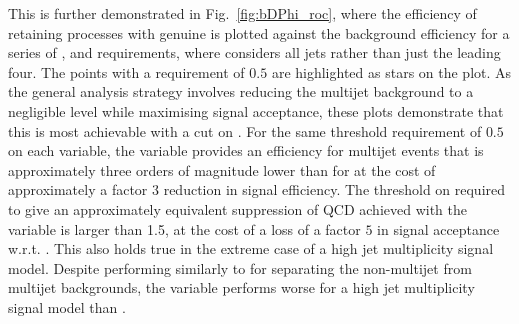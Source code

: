 This is further demonstrated in Fig.~\ref{fig:bDPhi_roc}, where the
efficiency of retaining processes with genuine \mht is plotted against
the \QCD background efficiency for a series of \bdphi, \dphimhtj and
\dphimhtjall requirements, where \dphimhtjall considers all jets rather than
just the leading four. The points with a requirement of $0.5$ are highlighted
as stars on the plot. As the general analysis strategy involves reducing
the \QCD multijet background to a negligible level while maximising
signal acceptance, these plots demonstrate that this is most
achievable with a cut on \bdphi. For the same threshold requirement of
$0.5$ on each variable, the \bdphi variable provides an efficiency for
multijet events that is approximately three orders of magnitude lower
than for \dphimhtj at the cost of approximately a factor $3$ reduction
in signal efficiency. The threshold on \bdphi required to give an
approximately equivalent suppression of QCD achieved with the
\dphimhtj variable is larger than 1.5, at the cost of a loss of a
factor $5$ in signal acceptance w.r.t. \bdphi. This also holds true in
the extreme case of a high jet multiplicity signal model.
Despite performing similarly to \bdphi for separating
the non-multijet from multijet backgrounds, the \dphimhtjall variable
performs worse for a high jet multiplicity signal model than \bdphi.

